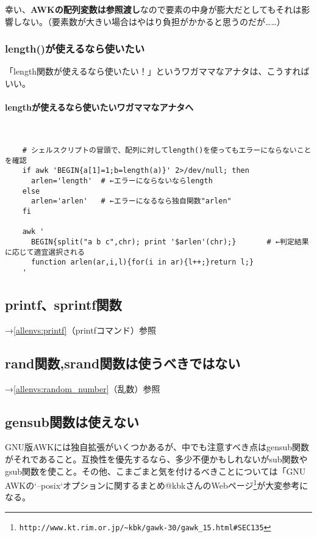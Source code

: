 幸い、\textbf{AWKの配列変数は参照渡し}なので要素の中身が膨大だとしてもそれは影響しない。（要素数が大きい場合はやはり負担がかかると思うのだが……）

\subsubsection*{length()が使えるなら使いたい}

「length関数が使えるなら使いたい！」というワガママなアナタは、こうすればいい。

\paragraph{lengthが使えるなら使いたいワガママなアナタへ} 　\\
\begin{frameboxit}{160.0mm}
\begin{verbatim}
	# シェルスクリプトの冒頭で、配列に対してlength()を使ってもエラーにならないことを確認
	if awk 'BEGIN{a[1]=1;b=length(a)}' 2>/dev/null; then
	  arlen='length'  # ←エラーにならないならlength
	else
	  arlen='arlen'   # ←エラーになるなら独自関数"arlen"
	fi

	awk '
	  BEGIN{split("a b c",chr); print '$arlen'(chr);}       # ←判定結果に応じて適宜選択される
	  function arlen(ar,i,l){for(i in ar){l++;}return l;}
	'
\end{verbatim}
\end{frameboxit}

\subsection*{printf、sprintf関数}

\noindent
→\ref{allenvs:printf}（printfコマンド）参照

\subsection*{rand関数,srand関数は使うべきではない}

\noindent
→\ref{allenvs:random_number}（乱数）参照

\subsection*{gensub関数は使えない}

GNU版AWKには独自拡張がいくつかあるが、中でも注意すべき点はgensub関数がそれであること。互換性を優先するなら、多少不便かもしれないがsub関数やgsub関数を使こと。その他、こまごまと気を付けるべきことについては「GNU AWKの`--posix`オプションに関するまとめ@kbkさんのWebページ\footnote{\verb|http://www.kt.rim.or.jp/~kbk/gawk-30/gawk_15.html#SEC135|}が大変参考になる。

